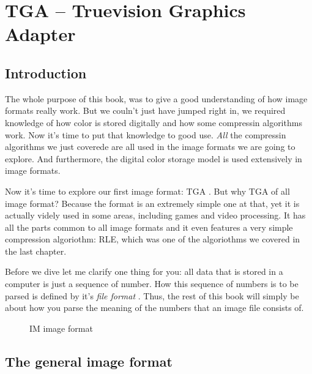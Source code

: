 \chapter{TGA -- Truevision Graphics Adapter}
\label{cha:tga}

\begin{refsection}

  \cite{91:_truev_tga_file_format_specif}

  \section{Introduction}
  \label{sec:introduction}

  The whole purpose of this book, was to give a good understanding of
  how image formats really work. But we couln't just have jumped right
  in, we required knowledge of how color is stored digitally and how
  some compressin algorithms work. Now it's time to put that knowledge
  to good use. \textit{All} the compressin algorithms we just coverede
  are all used in the image formats we are going to explore. And
  furthermore, the digital color storage model is used extensively in
  image formats.

  Now it's time to explore our first image format: TGA . But why TGA of
  all image format? Because the format is an extremely simple one at
  that, yet it is actually videly used in some areas, including games
  and video processing. It has all the parts common to all image
  formats and it even features a very simple compression algoriothm:
  RLE, which was one of the algoriothms we covered in the last
  chapter.

  Before we dive let me clarify one thing for you: all data that is
  stored in a computer is just a sequence of number. How this sequence
  of numbers is to be parsed is defined by it's \textit{file format}
  . Thus, the rest of this book will
  simply be about how you parse the meaning of the numbers that an
  image file consists of.

  \begin{figure}[h!]
    \centering

    \caption{IM image format}
    \label{fig:im}
  \end{figure}

  \section{The general image format}
  \label{sec:general-image-format}


\end{refsection}
